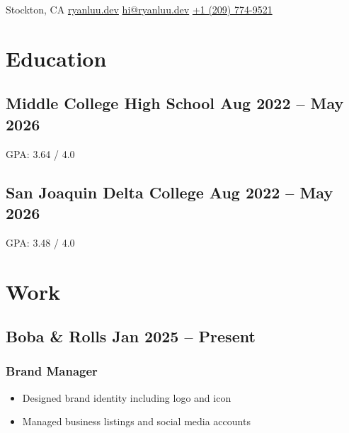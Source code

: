 \documentclass{my_cv}
\begin{document}

\begin{center}
    Stockton, CA {\large\textperiodcentered} 
    \href{https://ryanluu.dev/}{ryanluu.dev} {\large\textperiodcentered} 
    \href{mailto:hi@ryanluu.dev}{hi@ryanluu.dev} {\large\textperiodcentered} 
    \href{tel:12097749521}{+1 (209) 774-9521}
\end{center}

\section{Education}

\subsection{Middle College High School \hfill Aug 2022 -- May 2026}
GPA: 3.64 / 4.0

\subsection{San Joaquin Delta College \hfill Aug 2022 -- May 2026}
GPA: 3.48 / 4.0

\section{Work}

\subsection{Boba \& Rolls \hfill Jan 2025 -- Present}
\subsubsection{Brand Manager}
\begin{itemize}
    \item Designed brand identity including logo and icon
    \item Managed business listings and social media accounts
\end{itemize}

\end{document}
